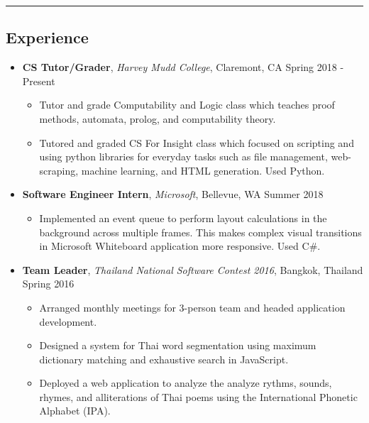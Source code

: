 \documentclass[10.5pt,letterpaper]{article}
\begin{document}
\hrule
\vspace{-1.0em}
\subsection*{Experience}
  \begin{itemize}
    \parskip=-0.2em

    \item[]
    {\textbf{CS Tutor/Grader}, \textit{Harvey Mudd College}, Claremont, CA \hfill {Spring 2018 - Present}}
    \begin{itemize}[label=\textbullet]
      \itemsep0.1em
      \item Tutor and grade Computability and Logic class which teaches proof methods, automata, prolog,
      and computability theory. 
      \item Tutored and graded CS For Insight class which focused 
      on scripting and using python libraries for everyday tasks such as file management, web-scraping, 
      machine learning, and HTML generation. Used Python.
    \end{itemize}
    
    \item[]
    {\textbf{Software Engineer Intern}, \textit{Microsoft}, Bellevue, WA \hfill {Summer 2018}}
    \begin{itemize}[label=\textbullet]
      \itemsep0.1em
      \item Implemented an event queue to perform layout calculations in the background 
      across multiple frames. This makes complex visual transitions in Microsoft Whiteboard application
      more responsive. Used C\#.
    \end{itemize}
    
    \item[]
    {\textbf{Team Leader}, \textit{Thailand National Software Contest 2016}, Bangkok, Thailand \hfill {Spring 2016}}
    \begin{itemize}[label=\textbullet]
      \itemsep0.1em
      \item Arranged monthly meetings for 3-person team and headed application development.
      \item Designed a system for Thai word segmentation using maximum dictionary matching and exhaustive 
      search in JavaScript.
      \item Deployed a web application to analyze the analyze rythms, sounds, rhymes, and alliterations of Thai 
      poems using the International Phonetic Alphabet (IPA).
      

\end{itemize}
\end{itemize}
\end{document}
